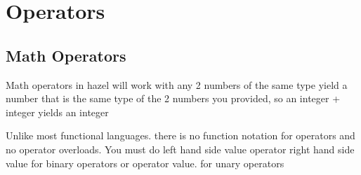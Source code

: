 \documentclass{article}
\begin{document}
\section{Operators}
\subsection{Math Operators}

Math operators in hazel will work with any 2 numbers of the same type yield a number that is the same type of the 2 numbers you provided, so
an integer + integer yields an integer 

Unlike most functional languages. there is no function notation for operators and no operator overloads. You must do left hand side value operator right hand side value for binary operators or operator value. for unary operators
\end{document}
